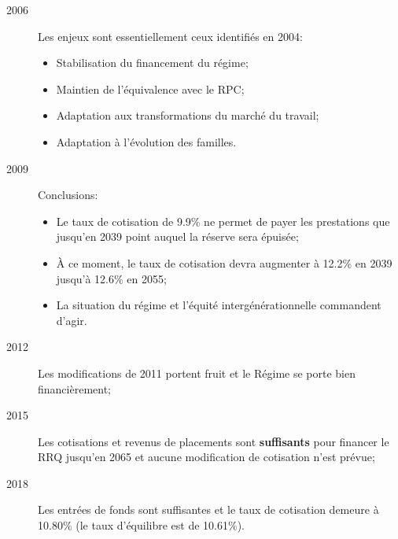 \documentclass[10pt, french]{article}
\begin{document}
\begin{multicols*}{3}
\begin{rappel_enhanced}
\begin{description}
	\item[2006]	Les enjeux sont essentiellement ceux identifiés en 2004:
		\begin{itemize}[leftmargin = *]
		\item	Stabilisation du financement du régime;
		\item	Maintien de l'équivalence avec le RPC;
		\item	Adaptation aux transformations du marché du travail;
		\item	Adaptation à l'évolution des familles.
		\end{itemize}
	\item[2009]	Conclusions:
		\begin{itemize}[leftmargin = *]
		\item	Le taux de cotisation de 9.9\% ne permet de payer les prestations que jusqu'en 2039 point auquel la réserve sera épuisée;
		\item	À ce moment, le taux de cotisation devra augmenter à 12.2\% en 2039 jusqu'à 12.6\% en 2055;
		\item	La situation du régime et l'équité intergénérationnelle commandent d'agir.
		\end{itemize}
	\item[2012]	Les modifications de 2011 portent fruit et le Régime se porte bien financièrement;
	\item[2015]	Les cotisations et revenus de placements sont \textbf{suffisants} pour financer le RRQ jusqu'en 2065 et aucune modification de cotisation n’est prévue;
	\item[2018]	Les entrées de fonds sont suffisantes et le taux de cotisation demeure à 10.80\% (le taux d'équilibre est de 10.61\%).
\end{description}
\end{rappel_enhanced}


\end{multicols*}
\end{document}
